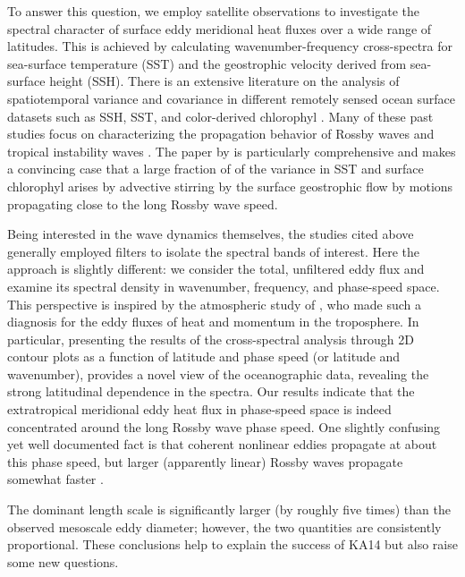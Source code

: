 \documentclass[10pt]{article}
\begin{document}
To answer this question, we employ satellite observations to investigate the spectral character of surface eddy meridional heat fluxes over a wide range of latitudes. This is achieved by calculating wavenumber-frequency cross-spectra for sea-surface temperature (SST) and the geostrophic velocity derived from sea-surface height (SSH). There is an extensive literature on the analysis of spatiotemporal variance and covariance in different remotely sensed ocean surface datasets such as SSH, SST, and color-derived chlorophyl \citep[see review by][]{OBrienEtAl2013}. Many of these past studies focus on characterizing the propagation behavior of Rossby waves \citep{CheltonSchalx1996,PolitoCornillon1997,CipolliniEtAl1997,HillEtAl2000,CipolliniEtAl2001,PolitoLiu2003,KillworthEtAl2004} and tropical instability waves \citep{PolitoEtAl2001,Contreras2002,CheltonEtAl2000,LeeEtAl2012}. The paper by \citet{KillworthEtAl2004} is particularly comprehensive and makes a convincing case that a large fraction of of the variance in SST and surface chlorophyl arises by advective stirring by the surface geostrophic flow by motions propagating close to the long Rossby wave speed.

Being interested in the wave dynamics themselves, the studies cited above generally employed filters to isolate the spectral bands of interest. Here the approach is slightly different: we consider the total, unfiltered eddy flux and examine its spectral density in wavenumber, frequency, and phase-speed space. This perspective is inspired by the atmospheric study of \citet[][henceforth RH91]{RandelHeld1991}, who made such a diagnosis for the eddy fluxes of heat and momentum in the troposphere. In particular, presenting the results of the cross-spectral analysis through 2D contour plots as a function of latitude and phase speed (or latitude and wavenumber), provides a novel view of the oceanographic data, revealing the strong latitudinal dependence in the spectra. Our results indicate that the extratropical meridional eddy heat flux in phase-speed space is indeed concentrated around the long Rossby wave phase speed. One slightly confusing yet well documented fact is  that coherent nonlinear eddies propagate at about this phase speed, but larger (apparently linear) Rossby waves propagate somewhat faster \citep{CheltonEtAl2007,CheltonEtAl2011}.

The dominant length scale is significantly larger (by roughly five times) than the observed mesoscale eddy diameter; however, the two quantities are consistently proportional. These conclusions help to explain the success of KA14 but also raise some new questions.
\end{document}
